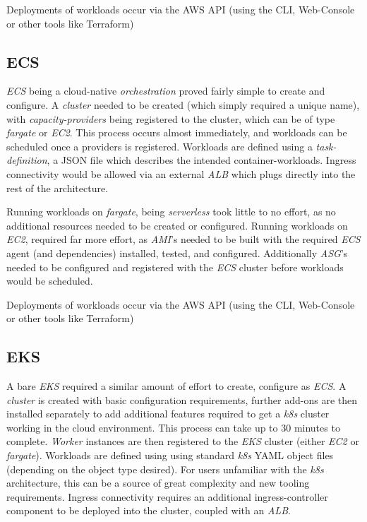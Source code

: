 Deployments of workloads occur via the AWS API (using the CLI, Web-Console or other tools like Terraform)

\subsection{ECS}
\textit{ECS} being a cloud-native \textit{orchestration} proved fairly simple to create and configure.
A \emph{cluster} needed to be created (which simply required a unique name), with \textit{capacity-providers} being registered to the cluster,
which can be of type \textit{fargate} or \textit{EC2}.
This process occurs almost immediately, and workloads can be scheduled once a providers is registered.
Workloads are defined using a \textit{task-definition}, a JSON file which describes the intended container-workloads.
Ingress connectivity would be allowed via an external \textit{ALB} which plugs directly into the rest of the architecture.

Running workloads on \textit{fargate}, being \textit{serverless} took little to no effort, as no additional resources needed to be created or configured.
Running workloads on \textit{EC2}, required far more effort, as \textit{AMI}'s needed to be built with the required \textit{ECS} agent (and dependencies) installed, tested,
and configured. Additionally \textit{ASG}'s needed to be configured and registered with the \textit{ECS} cluster before workloads would be scheduled.

Deployments of workloads occur via the AWS API (using the CLI, Web-Console or other tools like Terraform)

\subsection{EKS}
A bare \textit{EKS} required a similar amount of effort to create, configure as \textit{ECS}. A \emph{cluster} is created with basic configuration requirements,
further add-ons are then installed separately to add additional features required to get a \textit{k8s} cluster working in the cloud environment.
This process can take up to 30 minutes to complete.
\textit{Worker} instances are then registered to the \textit{EKS} cluster (either \textit{EC2} or \textit{fargate}).
Workloads are defined using using standard \textit{k8s} YAML object files (depending on the object type desired).
For users unfamiliar with the \textit{k8s} architecture, this can be a source of great complexity and new tooling requirements.
Ingress connectivity requires an additional ingress-controller component to be deployed into the cluster, coupled with an \textit{ALB}.


